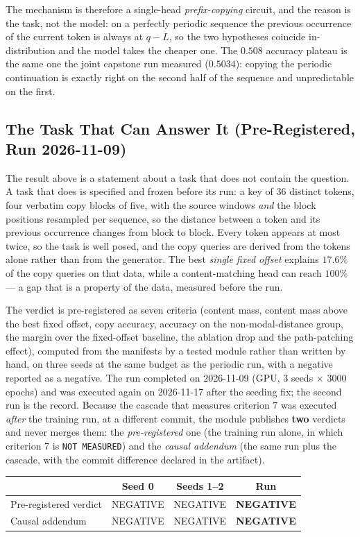 \documentclass[11pt]{article}
\begin{document}
The mechanism is therefore a single-head \emph{prefix-copying} circuit, and
the reason is the task, not the model: on a perfectly periodic sequence the
previous occurrence of the current token is always at $q-L$, so the two
hypotheses coincide in-distribution and the model takes the cheaper one.
The $0.508$ accuracy plateau is the same one the joint capstone run
measured ($0.5034$): copying the periodic continuation is exactly right on
the second half of the sequence and unpredictable on the first.

\subsection{The Task That Can Answer It (Pre-Registered, Run 2026-11-09)}
\label{sec:content-task}
The result above is a statement about a task that does not contain the
question. A task that does is specified and frozen before its run: a key of
$36$ distinct tokens, four verbatim copy blocks of five, with the source
windows \emph{and} the block positions resampled per sequence, so the
distance between a token and its previous occurrence changes from block to
block. Every token appears at most twice, so the task is well posed, and
the copy queries are derived from the tokens alone rather than from the
generator. The best \emph{single fixed offset} explains $17.6\%$ of the
copy queries on that data, while a content-matching head can reach $100\%$
--- a gap that is a property of the data, measured before the run.

The verdict is pre-registered as seven criteria (content mass, content mass
above the best fixed offset, copy accuracy, accuracy on the
non-modal-distance group, the margin over the fixed-offset baseline, the
ablation drop and the path-patching effect), computed from the manifests by
a tested module rather than written by hand, on three seeds at the same budget
as the periodic run, with a negative reported as a negative. The run
completed on 2026-11-09 (GPU, $3$ seeds $\times$ $3000$ epochs) and was executed again on
2026-11-17 after the seeding fix; the second run is the record. Because the
cascade that measures criterion 7 was executed \emph{after} the training run,
at a different commit, the module publishes \textbf{two} verdicts and never
merges them: the \emph{pre-registered} one (the training run alone, in which
criterion 7 is \texttt{NOT MEASURED}) and the \emph{causal addendum} (the same
run plus the cascade, with the commit difference declared in the artifact).

\begin{center}
\begin{tabular}{lccc}
\toprule
 & Seed 0 & Seeds 1--2 & Run \\
\midrule
Pre-registered verdict & NEGATIVE & NEGATIVE & \textbf{NEGATIVE} \\
Causal addendum & NEGATIVE & NEGATIVE & \textbf{NEGATIVE} \\
\bottomrule
\end{tabular}
\end{center}
\end{document}
